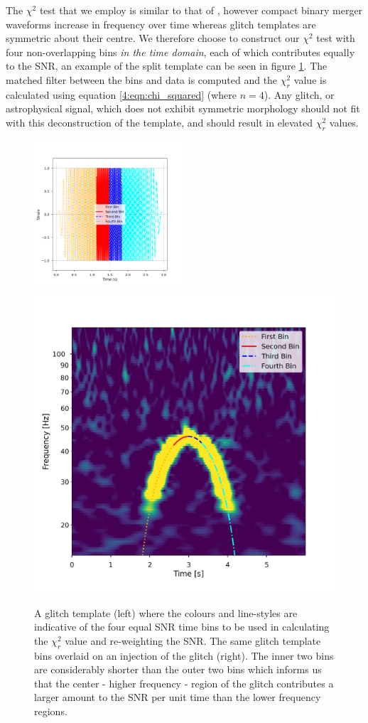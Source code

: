 The $\chi^2$ test that we employ is similar to that of \cite{Allen_Chi:2005}, however compact binary merger waveforms increase in frequency over time whereas \scl{} glitch templates are symmetric about their centre. We therefore choose to construct our $\chi^2$ test with four non-overlapping bins \emph{in the time domain}, each of which contributes equally to the SNR, an example of the split template can be seen in figure \ref{4:fig:split_temp_subplot}. The matched filter between the bins and data is computed and the $\chi_{r}^{2}$ value is calculated using equation \ref{4:eqn:chi_squared} (where $n=4$). Any glitch, or astrophysical signal, which does not exhibit symmetric morphology should not fit with this deconstruction of the template, and should result in elevated $\chi_{r}^{2}$ values.

\begin{figure}
  \centering
  \begin{minipage}[t]{1.0\linewidth}
  \includegraphics[width=0.49\textwidth]{images/4_archenemy/Section3/3.4/split_bins.pdf}
  \hspace{0.01\linewidth}
  \includegraphics[width=0.49\linewidth]{images/4_archenemy/Section3/3.4/split_bins_qscan.pdf}
  \end{minipage}
  \caption{A \scl{} glitch template (left) where the colours and line-styles are indicative of the four equal SNR time bins to be used in calculating the $\chi_{r}^{2}$ value and re-weighting the SNR. The same \scl{} glitch template bins overlaid on an injection of the \scl{} glitch (right). The inner two bins are considerably shorter than the outer two bins which informs us that the center - higher frequency - region of the \scl{} glitch contributes a larger amount to the SNR per unit time than the lower frequency regions.}
  \label{4:fig:split_temp_subplot}
\end{figure}


